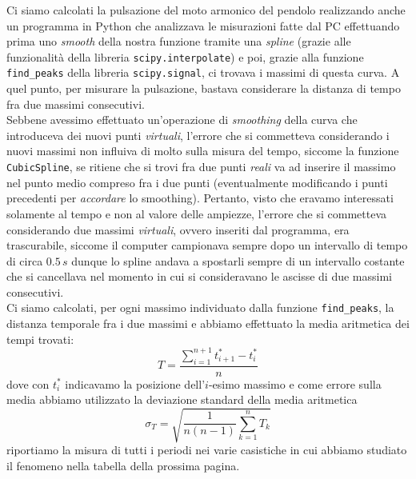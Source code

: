 \documentclass{article}
\begin{document}
Ci siamo calcolati la pulsazione del moto armonico del pendolo realizzando anche un programma in Python che analizzava le misurazioni fatte dal PC effettuando prima uno \emph{smooth} della nostra funzione tramite una \emph{spline} (grazie alle funzionalità della libreria \texttt{scipy.interpolate}) e poi, grazie alla funzione \texttt{find\_peaks} della libreria \texttt{scipy.signal}, ci trovava i massimi di questa curva. A quel punto, per misurare la pulsazione, bastava considerare la distanza di tempo fra due massimi consecutivi. \\ Sebbene avessimo effettuato un'operazione di \emph{smoothing} della curva che introduceva dei nuovi punti \emph{virtuali}, l'errore che si commetteva considerando i nuovi massimi non influiva di molto sulla misura del tempo, siccome la funzione \texttt{CubicSpline}, se ritiene che si trovi fra due punti \emph{reali} va ad inserire il massimo nel punto medio compreso fra i due punti (eventualmente modificando i punti precedenti per \emph{accordare} lo smoothing). Pertanto, visto che eravamo interessati solamente al tempo e non al valore delle ampiezze, l'errore che si commetteva considerando due massimi \emph{virtuali}, ovvero inseriti dal programma, era trascurabile, siccome il computer campionava sempre dopo un intervallo di tempo di circa $0.5 \, s$ dunque lo spline andava a spostarli sempre di un intervallo costante che si cancellava nel momento in cui si consideravano le ascisse di due massimi consecutivi. \\
Ci siamo calcolati, per ogni massimo individuato dalla funzione \texttt{find\_peaks}, la distanza temporale fra i due massimi e abbiamo effettuato la media aritmetica dei tempi trovati:
\begin{equation}
	T = \frac{\sum\limits_{i=1}^{n+1} t^{*}_{i+1} - t^{*}_i}{n}
\end{equation}
dove con $t^{*}_{i}$ indicavamo la posizione dell'$i$-esimo massimo e come errore sulla media abbiamo utilizzato la deviazione standard della media aritmetica
\begin{equation}
	\sigma_{T} = \sqrt{\frac{1}{n(n-1)}\sum_{k=1}^{n}{T_k}}
\end{equation}
riportiamo la misura di tutti i periodi nei varie casistiche in cui abbiamo studiato il fenomeno nella tabella della prossima pagina.
\newpage
\end{document}
